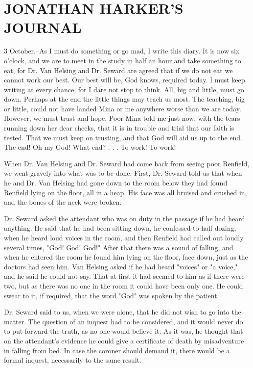 \chapter{JONATHAN HARKER'S JOURNAL}

3 October.--As I must do something or go mad, I write this diary. It is now six o'clock, and we are to meet in the study in half an hour and take something to eat, for Dr. Van Helsing and Dr. Seward are agreed that if we do not eat we cannot work our best. Our best will be, God knows, required today. I must keep writing at every chance, for I dare not stop to think. All, big and little, must go down. Perhaps at the end the little things may teach us most. The teaching, big or little, could not have landed Mina or me anywhere worse than we are today. However, we must trust and hope. Poor Mina told me just now, with the tears running down her dear cheeks, that it is in trouble and trial that our faith is tested. That we must keep on trusting, and that God will aid us up to the end. The end! Oh my God! What end? . . . To work! To work! 

When Dr. Van Helsing and Dr. Seward had come back from seeing poor Renfield, we went gravely into what was to be done. First, Dr. Seward told us that when he and Dr. Van Helsing had gone down to the room below they had found Renfield lying on the floor, all in a heap. His face was all bruised and crushed in, and the bones of the neck were broken. 

Dr. Seward asked the attendant who was on duty in the passage if he had heard anything. He said that he had been sitting down, he confessed to half dozing, when he heard loud voices in the room, and then Renfield had called out loudly several times, "God! God! God!" After that there was a sound of falling, and when he entered the room he found him lying on the floor, face down, just as the doctors had seen him. Van Helsing asked if he had heard "voices" or "a voice," and he said he could not say. That at first it had seemed to him as if there were two, but as there was no one in the room it could have been only one. He could swear to it, if required, that the word "God" was spoken by the patient. 

Dr. Seward said to us, when we were alone, that he did not wish to go into the matter. The question of an inquest had to be considered, and it would never do to put forward the truth, as no one would believe it. As it was, he thought that on the attendant's evidence he could give a certificate of death by misadventure in falling from bed. In case the coroner should demand it, there would be a formal inquest, necessarily to the same result. 

